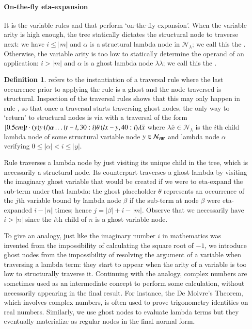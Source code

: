 \documentclass{elsarticle}
\theoremstyle{plain}
\theoremstyle{definition}
\newtheorem{definition}{Definition}[section]
\newcommand\Nodes{\mathcal{N}}%
\newcommand\NodesVar{\Nodes_{\sf var}}%
\newcommand\NodesLmd{\Nodes_\lambda}%
\newcommand{\ghostlmd}{{\lambda\!\!\lambda}}
\newcommand{\ghostvar}{\theta}
\begin{document}
\paragraph{On-the-fly eta-expansion}
It is the variable rules  and  that perform `on-the-fly expansion'. When the variable arity is high enough, the tree statically dictates the structural node to traverse next: we have $i \leq |m|$ and $\alpha$ is a structural lambda node in $\NodesLmd$; we call this the . Otherwise, the variable arity is too low to statically determine the operand of an application: $i > |m|$ and $\alpha$ is a ghost lambda node $\ghostlmd$; we call this the .

\begin{definition}
     refers to the instantiation of a traversal rule where the last occurrence prior to applying the rule is a ghost
    and the node traversed is structural.
    Inspection of the traversal rules shows that this may only happen in rule , so that once a traversal starts traversing ghost nodes, the only way to `return' to structural nodes is via  with a traversal of the form
    $
    \Pstr[0.5cm]{ t \cdot (y){y} \, (l){\alpha}  \ldots (t-l,30:i){\ghostvar}
        \, (lx-y,40:i){\lambda \overline{x}}}
    $
    where
     $\lambda \overline{x} \in \NodesLmd$ is the $i$th child lambda node of some structural variable node $y \in \NodesVar$
    and lambda node $\alpha$ verifying $0\leq |\alpha| < i \leq |y|$.
\end{definition}

Rule  traverses a lambda node by just visiting its unique child  in the tree, which is necessarily a structural node. Its counterpart \rulenamet{Lam^\ghostvar} traverses a ghost lambda by visiting the imaginary ghost variable that would be created if we were to eta-expand the sub-term under that lambda: the ghost placeholder $\ghostvar$ represents an occurrence of the $j$th variable bound by lambda node $\beta$ if the sub-term at node $\beta$ were eta-expanded $i-|n|$ times; hence $j = |\beta| + i - |m|$.
Observe that we necessarily have $i>|n|$ since the $i$th child of $n$ is a ghost variable node.

To give an analogy, just like the imaginary number $i$ in mathematics was invented from the impossibility of calculating the square root of $-1$, we introduce ghost nodes from the impossibility of resolving the argument of a variable when traversing a lambda term: they start to appear when the arity of a variable is too low to structurally traverse it.
Continuing with the analogy, complex numbers are sometimes used as an intermediate concept to perform some calculation, without necessarily appearing in the final result. For instance, the De Moivre's Theorem, which involves complex numbers, is often used to prove trigonometry identities on real numbers. Similarly, we use ghost nodes to evaluate lambda terms but they eventually materialize as regular nodes in the final normal form.
\end{document}
